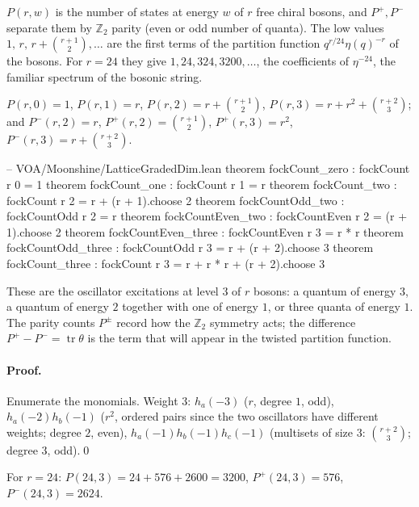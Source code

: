 \begin{physics}
$P(r,w)$ is the number of states at energy $w$ of $r$ free chiral bosons, and $P^+,P^-$ separate them by $\mathbb Z_2$ parity (even or odd number of quanta). The low values $1,\,r,\,r+\binom{r+1}2,\dots$ are the first terms of the partition function $q^{r/24}\eta(q)^{-r}$ of the bosons. For $r=24$ they give $1,24,324,3200,\dots$, the coefficients of $\eta^{-24}$, the familiar spectrum of the bosonic string.
\end{physics}

\begin{proposition}\label{ch04:prop:smallwt}
$P(r,0)=1$, $P(r,1)=r$, $P(r,2)=r+\binom{r+1}2$, $P(r,3)=r+r^2+\binom{r+2}3$; and
$P^-(r,2)=r$, $P^+(r,2)=\binom{r+1}2$, $P^+(r,3)=r^2$, $P^-(r,3)=r+\binom{r+2}3$.
\end{proposition}

\begin{leancode}
-- VOA/Moonshine/LatticeGradedDim.lean
theorem fockCount_zero : fockCount r 0 = 1
theorem fockCount_one : fockCount r 1 = r
theorem fockCount_two : fockCount r 2 = r + (r + 1).choose 2
theorem fockCountOdd_two : fockCountOdd r 2 = r
theorem fockCountEven_two : fockCountEven r 2 = (r + 1).choose 2
theorem fockCountEven_three : fockCountEven r 3 = r * r
theorem fockCountOdd_three : fockCountOdd r 3 = r + (r + 2).choose 3
theorem fockCount_three : fockCount r 3 = r + r * r + (r + 2).choose 3
\end{leancode}

\begin{physics}
These are the oscillator excitations at level $3$ of $r$ bosons: a quantum of energy $3$, a quantum of energy $2$ together with one of energy $1$, or three quanta of energy $1$. The parity counts $P^\pm$ record how the $\mathbb Z_2$ symmetry acts; the difference $P^+-P^-=\operatorname{tr}\theta$ is the term that will appear in the twisted partition function.
\end{physics}

\paragraph{Proof.} Enumerate the monomials. Weight $3$: $h_a(-3)$ ($r$, degree $1$, odd),
$h_a(-2)h_b(-1)$ ($r^2$, ordered pairs since the two oscillators have different weights; degree $2$,
even), $h_a(-1)h_b(-1)h_c(-1)$ (multisets of size $3$: $\binom{r+2}3$; degree $3$, odd).\qed

For $r=24$: $P(24,3)=24+576+2600=3200$, $P^+(24,3)=576$, $P^-(24,3)=2624$.

